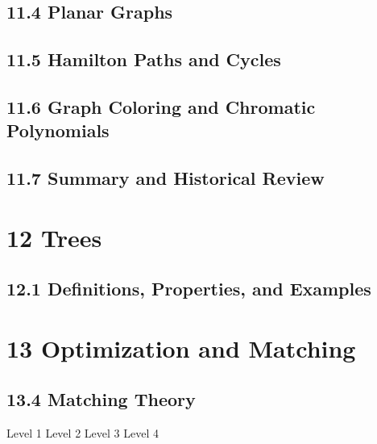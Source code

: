 \documentclass[a4paper]{article}
\begin{document}
\subsection*{11.4 Planar Graphs}
\subsection*{11.5 Hamilton Paths and Cycles}
\subsection*{11.6 Graph Coloring and Chromatic Polynomials}
\subsection*{11.7 Summary and Historical Review}

\section*{12 Trees}
\subsection*{12.1 Definitions, Properties, and Examples}

\section*{13 Optimization and Matching}
\subsection*{13.4 Matching Theory}


\begin{outline}[enumerate]
   \1 Level 1 
      \2 Level 2
         \3 Level 3
            \4 Level 4
\end{outline}
\end{document}
